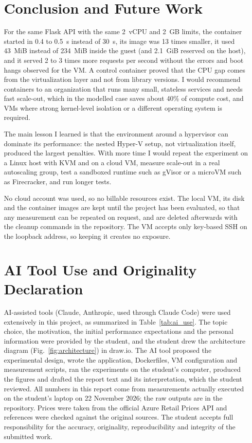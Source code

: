 \documentclass[conference,a4paper]{IEEEtran}
\begin{document}
\section{Conclusion and Future Work}
\label{sec:conclusion}

For the same Flask API with the same 2~vCPU and 2~GB limits, the container started in 0.4 to 0.5~s instead of 30~s, its image was 13 times smaller, it used 43~MiB instead of 234~MiB inside the guest (and 2.1~GiB reserved on the host), and it served 2 to 3 times more requests per second without the errors and boot hangs observed for the VM. A control container proved that the CPU gap comes from the virtualization layer and not from library versions. I would recommend containers to an organization that runs many small, stateless services and needs fast scale-out, which in the modelled case saves about 40\% of compute cost, and VMs where strong kernel-level isolation or a different operating system is required.

The main lesson I learned is that the environment around a hypervisor can dominate its performance: the nested Hyper-V setup, not virtualization itself, produced the largest penalties. With more time I would repeat the experiment on a Linux host with KVM and on a cloud VM, measure scale-out in a real autoscaling group, test a sandboxed runtime such as gVisor or a microVM such as Firecracker, and run longer tests.

No cloud account was used, so no billable resources exist. The local VM, its disk and the container images are kept until the project has been evaluated, so that any measurement can be repeated on request, and are deleted afterwards with the cleanup commands in the repository. The VM accepts only key-based SSH on the loopback address, so keeping it creates no exposure.

\section*{AI Tool Use and Originality Declaration}
\label{sec:ai_declaration}

AI-assisted tools (Claude, Anthropic, used through Claude Code) were used extensively in this project, as summarized in Table~\ref{tab:ai_use}. The topic choice, the motivation, the initial performance expectations and the personal information were provided by the student, and the student drew the architecture diagram (Fig.~\ref{fig:architecture}) in draw.io. The AI tool proposed the experimental design, wrote the application, Dockerfiles, VM configuration and measurement scripts, ran the experiments on the student's computer, produced the figures and drafted the report text and its interpretation, which the student reviewed. All numbers in this report come from measurements actually executed on the student's laptop on 22 November 2026; the raw outputs are in the repository. Prices were taken from the official Azure Retail Prices API and references were checked against the original sources. The student accepts full responsibility for the accuracy, originality, reproducibility and integrity of the submitted work.
\end{document}
